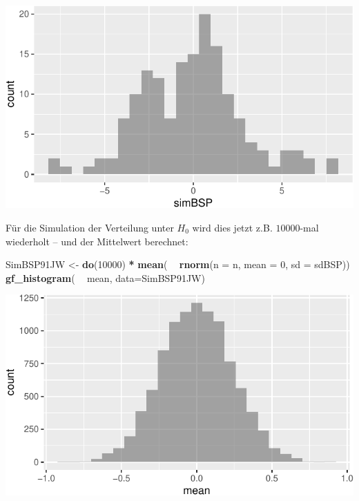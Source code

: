 \documentclass[12pt,ngerman,paper=a4,pagesize,DIV=13]{scrreprt}
\newenvironment{Shaded}{\begin{snugshade}}{\end{snugshade}}
\newcommand{\DataTypeTok}[1]{\textcolor[rgb]{0.13,0.29,0.53}{#1}}
\newcommand{\DecValTok}[1]{\textcolor[rgb]{0.00,0.00,0.81}{#1}}
\newcommand{\KeywordTok}[1]{\textcolor[rgb]{0.13,0.29,0.53}{\textbf{#1}}}
\newcommand{\NormalTok}[1]{#1}
\newcommand{\OperatorTok}[1]{\textcolor[rgb]{0.81,0.36,0.00}{\textbf{#1}}}
\newcommand{\StringTok}[1]{\textcolor[rgb]{0.31,0.60,0.02}{#1}}
\begin{document}
\includegraphics{DatenerhebungStatistik-Uebung_files/figure-latex/unnamed-chunk-125-1.pdf}

Für die Simulation der Verteilung unter \(H_0\) wird dies jetzt z.B.
\(10000\)-mal wiederholt -- und der Mittelwert berechnet:

\begin{Shaded}
\begin{Highlighting}[]
\NormalTok{SimBSP91JW <-}\StringTok{ }\KeywordTok{do}\NormalTok{(}\DecValTok{10000}\NormalTok{) }\OperatorTok{*}\StringTok{ }\KeywordTok{mean}\NormalTok{( }\OperatorTok{~}\StringTok{ }\KeywordTok{rnorm}\NormalTok{(}\DataTypeTok{n =}\NormalTok{ n, }\DataTypeTok{mean =} \DecValTok{0}\NormalTok{, }\DataTypeTok{sd =}\NormalTok{ sdBSP))}
\KeywordTok{gf_histogram}\NormalTok{( }\OperatorTok{~}\StringTok{ }\NormalTok{mean, }\DataTypeTok{data=}\NormalTok{SimBSP91JW)}
\end{Highlighting}
\end{Shaded}

\includegraphics{DatenerhebungStatistik-Uebung_files/figure-latex/unnamed-chunk-126-1.pdf}
\end{document}
